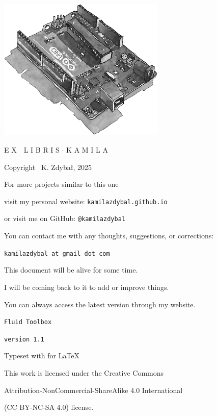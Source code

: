 \documentclass[12pt]{report}
\begin{document}
\thispagestyle{empty}
\begin{center}
\vspace*{1cm}
\includegraphics[width = 80mm]{ex_libris_arduino.jpg}

\vspace*{1cm}

{\fontsize{18}{10}\selectfont {}\selectfont E X \,\, L I B R I S $\cdotp$ K A M I L A}

\vspace*{2cm}

Copyright \textcopyright \, K. Zdybał, 2025

For more projects similar to this one

visit my personal website: \verb|kamilazdybal.github.io|

or visit me on GitHub: \verb|@kamilazdybal|

You can contact me with any thoughts, suggestions, or corrections:

\verb|kamilazdybal at gmail dot com|

\vspace*{0.6cm}

This document will be alive for some time. 

I will be coming back to it to add or improve things. 

You can always access the latest version through my website.

\vspace*{1.8cm}

\verb|Fluid Toolbox|

\verb|version 1.1|

Typeset with  for \LaTeX

\vspace*{1.8cm}

\noindent This work is licensed under the Creative Commons

Attribution-NonCommercial-ShareAlike 4.0 International 

(CC BY-NC-SA
4.0) license.
\end{center}
\end{document}

